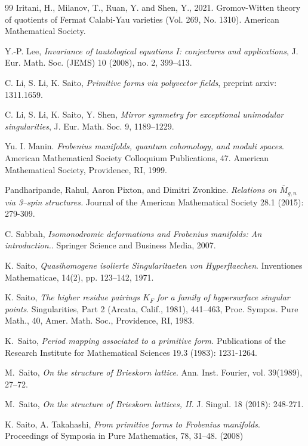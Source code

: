 \documentclass[12pt,a4paper]{amsart}
\newcommand{\<}{\left<}
\renewcommand{\>}{\right>}
\numberwithin{equation}{section}
\begin{document}
\begin{thebibliography}{99}
Iritani, H., Milanov, T., Ruan, Y. and Shen, Y., 2021. Gromov-Witten theory of quotients of Fermat Calabi-Yau varieties (Vol. 269, No. 1310). American Mathematical Society.

Y.-P. Lee, {\it Invariance of tautological equations I: conjectures and applications},
J. Eur. Math. Soc. (JEMS) 10 (2008), no. 2, 399--413.

C. Li, S. Li, K. Saito, \textit{Primitive forms via polyvector fields}, preprint arxiv: 1311.1659.

C. Li, S. Li, K. Saito, Y. Shen, \textit{Mirror symmetry for exceptional unimodular singularities},
J. Eur. Math. Soc. 9, 1189--1229.


 Yu. I. Manin. {\it Frobenius manifolds, quantum cohomology, and moduli spaces}. American Mathematical Society Colloquium Publications, 47. American Mathematical Society, Providence, RI, 1999.


Pandharipande, Rahul, Aaron Pixton, and Dimitri Zvonkine. 
\textit{Relations on $\overline {M}_{g,n}$ via 3--spin structures.} 
Journal of the American Mathematical Society 28.1 (2015): 279-309.

C. Sabbah, \textit{Isomonodromic deformations and Frobenius manifolds: An introduction.}. Springer Science and Business Media, 2007.

K. Saito, 
\textit{Quasihomogene isolierte Singularitaeten von Hyperflaechen}. 
Inventiones Mathematicae, 14(2), pp. 123--142, 1971.

K. Saito, \textit{The higher residue pairings $K_F$ for a family of hypersurface singular points}. 
Singularities, Part 2 (Arcata, Calif., 1981), 441--463, Proc. Sympos. Pure Math., 40, Amer. Math.
Soc., Providence, RI, 1983.

K.~Saito, \textit{Period mapping associated to a primitive form.}
Publications of the Research Institute for Mathematical Sciences 19.3 (1983): 1231-1264.

    M.~Saito, {\it On the structure of Brieskorn lattice}. Ann. Inst. Fourier, vol. 39(1989), 27--72.

    M.~Saito, {\it On the structure of Brieskorn lattices, II}.
    J. Singul. 18 (2018): 248-271.

 K. Saito, A. Takahashi, \textit{From primitive forms to Frobenius manifolds}. Proceedings of Symposia in Pure Mathematics, 78, 31--48. (2008)


\end{thebibliography}
\end{document}
